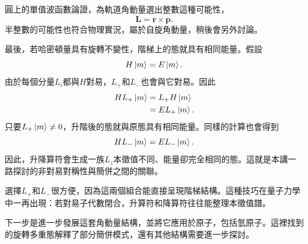 圓上的單值波函數論證，為軌道角動量選出整數這種可能性，
\begin{equation}
\mathbf L=\mathbf r\times\mathbf p.
\end{equation}
半整數的可能性也符合物理實況，屬於自旋角動量，稍後會另外討論。

最後，若哈密頓量具有旋轉不變性，階梯上的態就具有相同能量。假設
\begin{equation}
H\left\lvert m\right\rangle=E\left\lvert m\right\rangle.
\end{equation}
由於每個分量\(L_i\)都與\(H\)對易，\(L_+\)和\(L_-\)也會與它對易。因此
\begin{align}
H L_+\left\lvert m\right\rangle
&=L_+H\left\lvert m\right\rangle\\
&=E L_+\left\lvert m\right\rangle.
\end{align}
只要\(L_+\left\lvert m\right\rangle\neq0\)，升階後的態就與原態具有相同能量。同樣的計算也會得到
\begin{equation}
H L_-\left\lvert m\right\rangle=E L_-\left\lvert m\right\rangle.
\end{equation}
因此，升降算符會生成一族\(L_z\)本徵值不同、能量卻完全相同的態。這就是本講一路探討的非對易對稱性與簡併之間的關聯。

\begin{classroomqa}
\end{classroomqa}

選擇\(L_+\)和\(L_-\)很方便，因為這兩個組合能直接呈現階梯結構。這種技巧在量子力學中一再出現：若對易子代數閉合，升算符和降算符往往能整理本徵值譜。

\begin{classroomqa}
\end{classroomqa}

下一步是進一步發展這套角動量結構，並將它應用於原子，包括氫原子。這裡找到的旋轉多重態解釋了部分簡併模式，還有其他結構需要進一步探討。